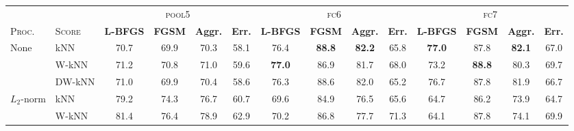 \begin{table}
\renewcommand{\tabcolsep}{2.7pt}
%
%
\centering
\begin{tabularx}{\linewidth}{Xlcccccccccccc}
\toprule
                                                         &                & \multicolumn{4}{c}{\textsc{pool5}} & \multicolumn{4}{c}{\textsc{fc6}} & \multicolumn{4}{c}{\textsc{fc7}} \\
                                                                            \cmidrule(lr){3-6}                   \cmidrule(lr){7-10}                \cmidrule(lr){11-14}
\textsc{Proc.}                                           & \textsc{Score} & \footnotesize\sloppy\textbf{L-BFGS} & \footnotesize\textbf{FGSM} & \footnotesize\textbf{Aggr.} & \footnotesize\textbf{Err.}
                                                                          & \footnotesize\sloppy\textbf{L-BFGS} & \footnotesize\textbf{FGSM} & \footnotesize\textbf{Aggr.} & \footnotesize\textbf{Err.}
                                                                          & \footnotesize\sloppy\textbf{L-BFGS} & \footnotesize\textbf{FGSM} & \footnotesize\textbf{Aggr.} & \footnotesize\textbf{Err.} \\
\midrule
\multirow{3}{*}{None}                                    &    kNN & 70.7          & 69.9          & 70.3          & 58.1          & 76.4          & \textbf{88.8} & \textbf{82.2} & 65.8          & \textbf{77.0} & 87.8          & \textbf{82.1} & 67.0          \\
                                                         &  W-kNN & 71.2          & 70.8          & 71.0          & 59.6          & \textbf{77.0} & 86.9          & 81.7          & 68.0          & 73.2          & \textbf{88.8} & 80.3          & 69.7          \\
                                                         & DW-kNN & 71.0          & 69.9          & 70.4          & 58.6          & 76.3          & 88.6          & 82.0          & 65.2          & 76.7          & 87.8          & 81.9          & 66.7          \\ \midrule
\multirow{3}{*}{$L_2$-norm}                              &    kNN & 79.2          & 74.3          & 76.7          & 60.7          & 69.6          & 84.9          & 76.5          & 65.6          & 64.7          & 86.2          & 73.9          & 64.7          \\
                                                         &  W-kNN & 81.4          & 76.4          & 78.9          & 62.9          & 70.2          & 86.8          & 77.7          & 71.3          & 64.1          & 87.8          & 74.1          & 69.9          \\

\end{tabularx}
\end{table}
